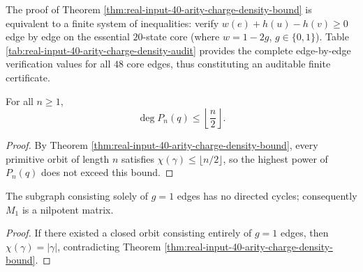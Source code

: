 \begin{remark}\label{rem:real-input-40-arity-charge-density-audit}
The proof of Theorem \ref{thm:real-input-40-arity-charge-density-bound} is equivalent to a finite system of inequalities:
verify $w(e)+h(u)-h(v)\ge 0$ edge by edge on the essential $20$-state core (where $w=1-2g$, $g\in\{0,1\}$).
Table \ref{tab:real-input-40-arity-charge-density-audit} provides the complete edge-by-edge verification values for all $48$ core edges, thus constituting an auditable finite certificate.
\end{remark}


\begin{corollary}\label{cor:real-input-40-arity-charge-degree-bound}
For all $n\ge 1$,
\[
\deg P_n(q)\le \left\lfloor \frac{n}{2}\right\rfloor.
\]
\end{corollary}

\begin{proof}
By Theorem \ref{thm:real-input-40-arity-charge-density-bound}, every primitive orbit of length $n$ satisfies $\chi(\gamma)\le \lfloor n/2\rfloor$, so the highest power of $P_n(q)$ does not exceed this bound.
\end{proof}

\begin{corollary}[$g=1$ subgraph is acyclic and $M_1$ is nilpotent]\label{cor:real-input-40-arity-charge-g1-acyclic}
The subgraph consisting solely of $g=1$ edges has no directed cycles; consequently $M_1$ is a nilpotent matrix.
\end{corollary}

\begin{proof}
If there existed a closed orbit consisting entirely of $g=1$ edges, then $\chi(\gamma)=|\gamma|$, contradicting Theorem \ref{thm:real-input-40-arity-charge-density-bound}.
\end{proof}

